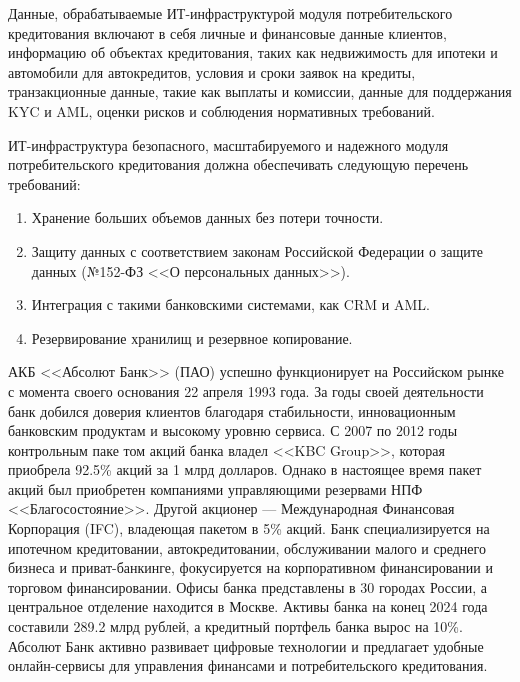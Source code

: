 \documentclass[14pt, a4paper]{extarticle}
\begin{document}
Данные, обрабатываемые ИТ-инфраструктурой модуля потребительского кредитования
включают в себя личные и финансовые данные клиентов, информацию об объектах
кредитования, таких как недвижимость для ипотеки и автомобили для автокредитов,
условия и сроки заявок на кредиты, транзакционные данные, такие как выплаты и
комиссии, данные для поддержания KYC и AML, оценки рисков и соблюдения
нормативных требований.

ИТ-инфраструктура безопасного, масштабируемого и надежного модуля
потребительского кредитования должна обеспечивать следующую перечень требований:

\begin{enumerate}
	\item Хранение больших объемов данных без потери точности.
	\item Защиту данных с соответствием законам Российской Федерации о защите
данных (№152-ФЗ <<О персональных данных>>).
	\item Интеграция с такими банковскими системами, как CRM и AML.
	\item Резервирование хранилищ и резервное копирование.
\end{enumerate}

АКБ <<Абсолют Банк>> (ПАО) успешно функционирует на Российском рынке с момента
своего основания 22 апреля 1993 года. За годы своей деятельности банк добился
доверия клиентов благодаря стабильности, инновационным банковским продуктам и
высокому уровню сервиса. С 2007 по 2012 годы контрольным паке том акций банка
владел <<KBC Group>>, которая приобрела 92.5\% акций за 1 млрд долларов. Однако
в настоящее время пакет акций был приобретен компаниями управляющими резервами
НПФ <<Благосостояние>>. Другой акционер — Международная Финансовая Корпорация
(IFC), владеющая пакетом в 5\% акций. Банк специализируется на ипотечном
кредитовании, автокредитовании, обслуживании малого и среднего бизнеса и
приват-банкинге, фокусируется на корпоративном финансировании и торговом
финансировании. Офисы банка представлены в 30 городах России, а центральное
отделение находится в Москве. Активы банка на конец 2024 года составили 289.2
млрд рублей, а кредитный портфель банка вырос на 10\%. Абсолют Банк активно
развивает цифровые технологии и предлагает удобные онлайн-сервисы для
управления финансами и потребительского кредитования.
\end{document}
